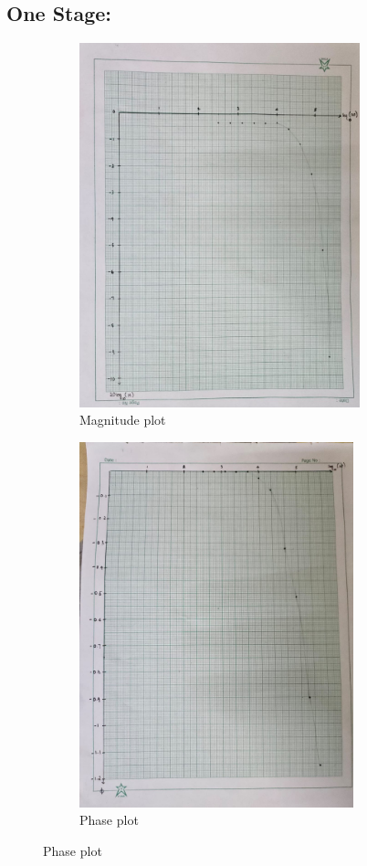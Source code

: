 \documentclass[a4paper,12pt]{article}
\begin{document}
\subsection{One Stage:}
\pagebreak
\begin{figure}[h!]
	\begin{subfigure}[b]{100pt}
		\caption{Magnitude plot}
		\includegraphics[width = 230pt]{figs/fig1.png}
	\end{subfigure}
	\hspace{110pt}
	\begin{subfigure}[b]{100pt}
		\caption{Phase plot}
		\includegraphics[width = 225pt]{figs/fig2.png}
	\end{subfigure}
\end{figure}
\end{document}
